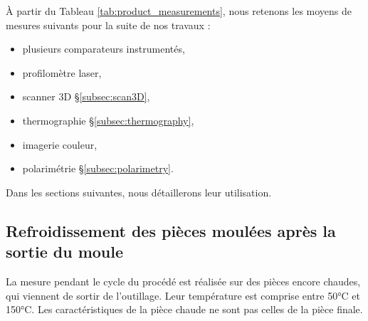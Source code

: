 À partir du Tableau \ref{tab:product_measurements}, nous retenons les moyens de mesures suivants pour la suite de nos travaux :
\begin{itemize}
	\item plusieurs comparateurs instrumentés,
	\item profilomètre laser,
	\item scanner 3D §\ref{subsec:scan3D},
	\item thermographie §\ref{subsec:thermography},
	\item imagerie couleur,
	\item polarimétrie §\ref{subsec:polarimetry}.
\end{itemize}
%
%
%
Dans les sections suivantes, nous détaillerons leur utilisation.


\subsection{Refroidissement des pièces moulées après la sortie du moule}
La mesure pendant le cycle du procédé est réalisée sur des pièces encore chaudes, qui viennent de sortir de l'outillage.
Leur température est comprise entre 50°C et 150°C.
Les caractéristiques de la pièce chaude ne sont pas celles de la pièce finale.

